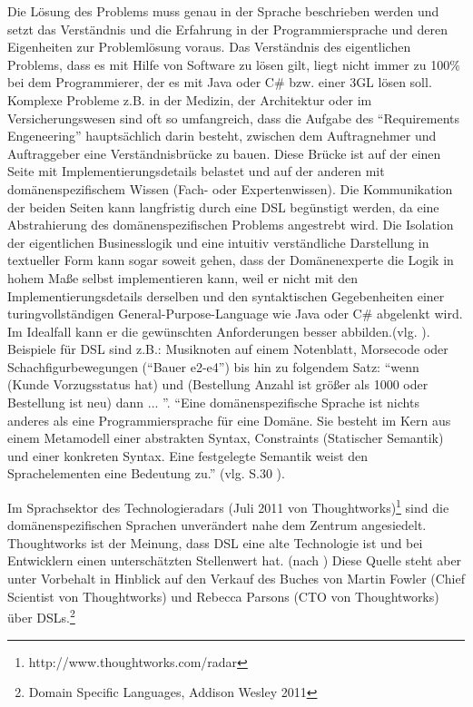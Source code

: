 \documentclass[11pt,english,ngerman, headsepline]{scrreprt}
\begin{document}
Die Lösung des Problems muss genau in der Sprache beschrieben werden und setzt
das Verständnis und die Erfahrung in der Programmiersprache und deren
Eigenheiten zur Problemlösung voraus. Das Verständnis des eigentlichen Problems,
dass es mit Hilfe von Software zu lösen gilt, liegt nicht immer zu 100\% bei dem
Programmierer, der es mit Java oder C\# bzw. einer 3GL lösen soll. Komplexe
Probleme z.B. in der Medizin, der Architektur oder im Versicherungswesen sind
oft so umfangreich, dass die Aufgabe des “Requirements Engeneering”
hauptsächlich darin besteht, zwischen dem Auftragnehmer und Auftraggeber eine
Verständnisbrücke zu bauen. Diese Brücke ist auf der einen Seite mit
Implementierungsdetails belastet und auf der anderen mit domänenspezifischem
Wissen (Fach- oder Expertenwissen). Die Kommunikation der beiden Seiten kann
langfristig durch eine DSL begünstigt werden, da eine Abstrahierung des
domänenspezifischen Problems angestrebt wird. Die Isolation der eigentlichen
Businesslogik und eine intuitiv verständliche Darstellung in textueller Form
kann sogar soweit gehen, dass der Domänenexperte die Logik in hohem Maße selbst
implementieren kann, weil er nicht mit den Implementierungsdetails derselben und
den syntaktischen Gegebenheiten einer turingvollständigen
General-Purpose-Language wie Java oder C\# abgelenkt wird. Im Idealfall kann er
die gewünschten Anforderungen besser abbilden.(vlg. \cite{heiseMPS2}). Beispiele
für DSL sind z.B.: Musiknoten auf einem Notenblatt, Morsecode oder
Schachfigurbewegungen (“Bauer e2-e4”) bis hin zu folgendem Satz: “wenn (Kunde
Vorzugsstatus hat) und (Bestellung Anzahl ist größer als 1000 oder Bestellung
ist neu) dann ... ”. “Eine domänenspezifische Sprache ist nichts anderes als
eine Programmiersprache für eine Domäne. Sie besteht im Kern aus einem
Metamodell einer abstrakten Syntax, Constraints (Statischer Semantik) und einer
konkreten Syntax. Eine festgelegte Semantik weist den Sprachelementen eine
Bedeutung zu.” (vlg. S.30 \cite{mdaDPunkt}). 

Im Sprachsektor des Technologieradars (Juli 2011 von
Thoughtworks)\footnote{http://www.thoughtworks.com/radar}
sind die domänenspezifischen Sprachen unverändert nahe dem Zentrum
angesiedelt. Thoughtworks ist der Meinung, dass DSL eine alte Technologie ist
und bei Entwicklern einen unterschätzten Stellenwert
hat. (nach \cite{thoughtworks-tr}) Diese Quelle steht aber unter Vorbehalt in
Hinblick auf den Verkauf des Buches von Martin Fowler (Chief Scientist von
Thoughtworks) und Rebecca Parsons (CTO von Thoughtworks) über DSLs.\footnote{Domain Specific
Languages, Addison Wesley 2011} 
 
\end{document}
